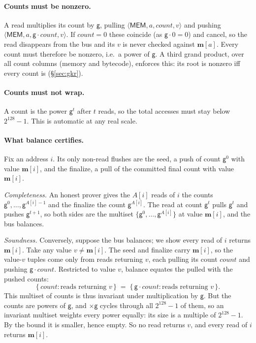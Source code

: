 \documentclass[11pt]{article}
\newcommand{\gen}{\mathsf{g}}
\newcommand{\mem}{\mathbf{m}}
\newcommand{\cnt}{\mathit{count}}
\newcommand{\tup}[1]{\langle #1 \rangle}
\newcommand{\dsep}[1]{\mathsf{#1}}
\begin{document}
\paragraph{Counts must be nonzero.} A read multiplies its count by $\gen$, pulling $\tup{\dsep{MEM},a,\cnt,v}$ and pushing $\tup{\dsep{MEM},a,\gen\cdot\cnt,v}$. If $\cnt=0$ these coincide (as $\gen\cdot0=0$) and cancel, so the read disappears from the bus and its $v$ is never checked against $\mem[a]$. Every count must therefore be nonzero, i.e.\ a power of $\gen$. A third grand product, over all count columns (memory and bytecode), enforces this: its root is nonzero iff every count is (\S\ref{sec:gkr}).

\paragraph{Counts must not wrap.} A count is the power $\gen^{t}$ after $t$ reads, so the total accesses must stay below $2^{128}-1$. This is automatic at any real scale.

\paragraph{What balance certifies.} Fix an address $i$. Its only non-read flushes are the seed, a push of count $\gen^{0}$ with value $\mem[i]$, and the finalize, a pull of the committed final count with value $\mem[i]$.

\emph{Completeness.} An honest prover gives the $A[i]$ reads of $i$ the counts $\gen^{0},\dots,\gen^{A[i]-1}$ and the finalize the count $\gen^{A[i]}$. The read at count $\gen^{t}$ pulls $\gen^{t}$ and pushes $\gen^{t+1}$, so both sides are the multiset $\{\gen^{0},\dots,\gen^{A[i]}\}$ at value $\mem[i]$, and the bus balances.

\emph{Soundness.} Conversely, suppose the bus balances; we show every read of $i$ returns $\mem[i]$. Take any value $v\neq\mem[i]$. The seed and finalize carry $\mem[i]$, so the value-$v$ tuples come only from reads returning $v$, each pulling its count $\cnt$ and pushing $\gen\cdot\cnt$. Restricted to value $v$, balance equates the pulled with the pushed counts:
\[
  \{\,\cnt : \text{reads returning } v\,\}\;=\;\{\,\gen\cdot\cnt : \text{reads returning } v\,\}.
\]
This multiset of counts is thus invariant under multiplication by $\gen$. But the counts are powers of $\gen$, and $\times\gen$ cycles through all $2^{128}-1$ of them, so an invariant multiset weights every power equally: its size is a multiple of $2^{128}-1$. By the bound it is smaller, hence empty. So no read returns $v$, and every read of $i$ returns $\mem[i]$.
\end{document}
